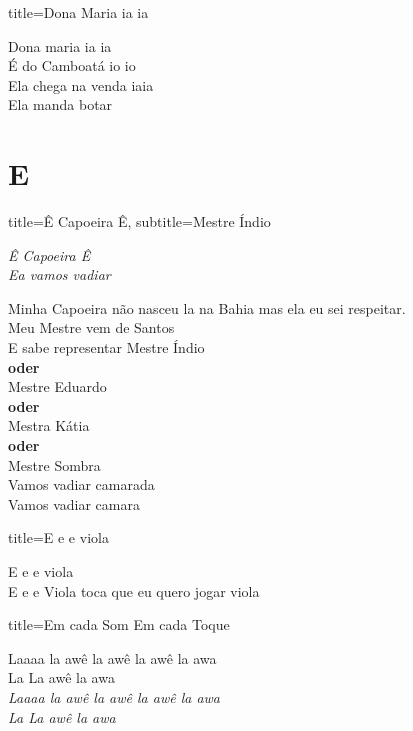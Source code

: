 \documentclass[fontsize=14pt, paper=a4, twoside, DIV=20]{scrreprt} %
\newcommand\chapTOC[1]{
    \chapter*{#1}
    \addcontentsline{toc}{chapter}{#1}
    \markboth{#1}{#1}}
\begin{document}
\begin{multicols*}{2}
\begin{song}{title={Dona Maria ia ia}}
        \begin{verse*}
            Dona maria ia ia\\
            É do Camboatá io io\\
            Ela chega na venda iaia\\
            Ela manda botar\\
        \end{verse*}
\end{song}

\chapTOC{E}


\begin{song}{title={Ê Capoeira Ê}, subtitle={Mestre Índio}}
    \begin{chorus*}
        \textit{Ê Capoeira Ê \\
        Ea vamos vadiar\\}
    \end{chorus*}
        \begin{verse*}
            Minha Capoeira não nasceu la na Bahia mas ela eu sei respeitar.\\
            Meu Mestre vem de Santos\\
            E sabe representar Mestre Índio \\
            \textbf{oder}\\
            Mestre Eduardo\\
            \textbf{oder}\\
            Mestra Kátia\\
            \textbf{oder}\\
            Mestre Sombra\\

            Vamos vadiar camarada\\
            Vamos vadiar camara\\
        \end{verse*}
\end{song}



\begin{song}{title={E e e viola}}
        \begin{verse*}
            E e e viola\\
            E e e Viola toca que eu quero jogar viola\\
        \end{verse*}
\end{song}

\columnbreak
\begin{song}{title={Em cada Som Em cada Toque}}
    \begin{chorus*}
            Laaaa la awê la awê la awê la awa\\
            La La awê la awa\\
            \textit{Laaaa la awê la awê la awê la awa}\\
            \textit{La La awê la awa}\\
    \end{chorus*}
        \begin{verse*}


\end{verse*}
\end{song}
\end{multicols*}
\end{document}
